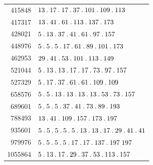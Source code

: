 \begin{longtable}{@{}r|l@{}}
415848 & $13\pdot 17\pdot 17\pdot 37\pdot 101\pdot 109\pdot 113$\\
417317 & $13\pdot 41\pdot 61\pdot 113\pdot 137\pdot 173$\\
428021 & $5\pdot 13\pdot 37\pdot 41\pdot 61\pdot 97\pdot 157$\\
448976 & $5\pdot 5\pdot 5\pdot 17\pdot 61\pdot 89\pdot 101\pdot 173$\\
462953 & $29\pdot 41\pdot 53\pdot 101\pdot 113\pdot 149$\\
521044 & $5\pdot 13\pdot 13\pdot 17\pdot 17\pdot 73\pdot 97\pdot 157$\\
527329 & $5\pdot 17\pdot 37\pdot 61\pdot 61\pdot 109\pdot 109$\\
658576 & $5\pdot 5\pdot 13\pdot 13\pdot 13\pdot 13\pdot 53\pdot 73\pdot 157$\\
689601 & $5\pdot 5\pdot 5\pdot 37\pdot 41\pdot 73\pdot 89\pdot 193$\\
788493 & $13\pdot 41\pdot 109\pdot 157\pdot 173\pdot 197$\\
935601 & $5\pdot 5\pdot 5\pdot 5\pdot 5\pdot 13\pdot 13\pdot 17\pdot 29\pdot 41\pdot 41$\\
979976 & $5\pdot 5\pdot 5\pdot 5\pdot 17\pdot 17\pdot 137\pdot 197\;197$\\
1055864 & $5\pdot 13\pdot 17\pdot 29\pdot 37\pdot 53\pdot 113\pdot 157$\\
\end{longtable}\endgroup

